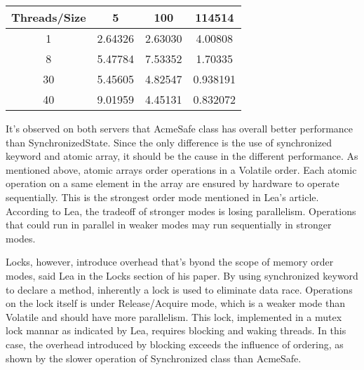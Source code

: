 \documentclass[letterpaper,twocolumn,10pt]{article}
\begin{document}
\begin{enumerate}
\begin{enumerate}
\begin{center}
      \begin{tabular}{|c|c|c|c|}
      \hline
        Threads/Size & 5 & 100 & 114514 \\
      \hline 1 & 2.64326 & 2.63030 & 4.00808 \\
      \hline 8 & 5.47784 & 7.53352 & 1.70335 \\
      \hline 30 & 5.45605 & 4.82547 & 0.938191 \\
      \hline 40 & 9.01959 & 4.45131 & 0.832072 \\
      \hline
      \end{tabular}
    \end{center}
  \end{enumerate}
\end{enumerate}



It's observed on both servers that AcmeSafe class has overall better performance than SynchronizedState.
Since the only difference is the use of synchronized keyword and atomic array, it should be the cause in the different performance. 
As mentioned above, atomic arrays order operations in a Volatile order.
Each atomic operation on a same element in the array are ensured by hardware to operate sequentially.
This is the strongest order mode mentioned in Lea's article.
According to Lea, the tradeoff of stronger modes is losing parallelism.
Operations that could run in parallel in weaker modes may run sequentially in stronger modes.

Locks, however, introduce overhead that's byond the scope of memory order modes, said Lea in the Locks section of his paper.
By using synchronized keyword to declare a method, inherently a lock is used to eliminate data race.
Operations on the lock itself is under Release/Acquire mode, which is a weaker mode than Volatile and should have more parallelism.
This lock, implemented in a mutex lock mannar as indicated by Lea, requires blocking and waking threads.
In this case, the overhead introduced by blocking exceeds the influence of ordering, as shown by the slower operation of Synchronized class than AcmeSafe.




\end{document}
